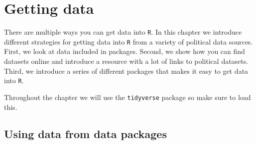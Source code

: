 \documentclass[12pt,oneside]{reedthesis}
\theoremstyle{definition}
\theoremstyle{definition}
\theoremstyle{definition}
\theoremstyle{remark}
\begin{document}
  \chapter{Getting data}\label{datadownload}
  
  There are multiple ways you can get data into \texttt{R}. In this
  chapter we introduce different strategies for getting data into
  \texttt{R} from a variety of political data sources. First, we look at
  data included in packages. Second, we show how you can find datasets
  online and introduce a resource with a lot of links to political
  datasets. Third, we introduce a series of different packages that makes
  it easy to get data into \texttt{R}.
  
  Throughout the chapter we will use the \texttt{tidyverse} package so
  make sure to load this.
  \begin{Shaded}
  \begin{Highlighting}[]
  \NormalTok{(}\NormalTok{)}
  \end{Highlighting}
  \end{Shaded}
  \section{Using data from data
  packages}\label{using-data-from-data-packages}
  
\end{document}
